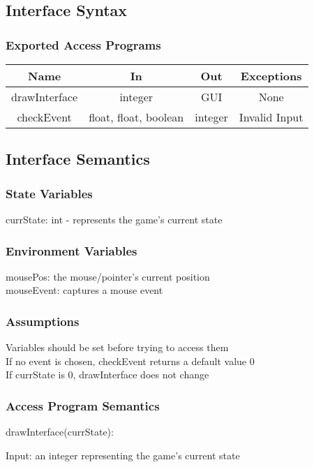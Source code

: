\documentclass[12pt, titlepage]{article}
\begin{document}
		\subsection{Interface Syntax}
		\subsubsection{Exported Access Programs}
		\begin{tabular}[pos]{|c|c|c|c|}
			\hline
			\textbf{Name}& \textbf{In} & \textbf{Out} & \textbf{Exceptions} \\ \hline
			drawInterface & integer & GUI & None \\ \hline
			checkEvent & float, float, boolean & integer & Invalid Input \\ \hline
			
		\end{tabular}
		
		\subsection{Interface Semantics}
		\subsubsection{State Variables}
		currState: int - represents the game's current state
		
		\subsubsection{Environment Variables}
		mousePos: the mouse/pointer's current position\\
		mouseEvent: captures a mouse event 
		\subsubsection{Assumptions}
		Variables should be set before trying to access them \\ 
		If no event is chosen, checkEvent returns a default value 0 \\
		If currState is 0, drawInterface does not change \\
		
		\subsubsection{Access Program Semantics}
		drawInterface(currState):
		
		Input: an integer representing the game's current state
		
\end{document}
